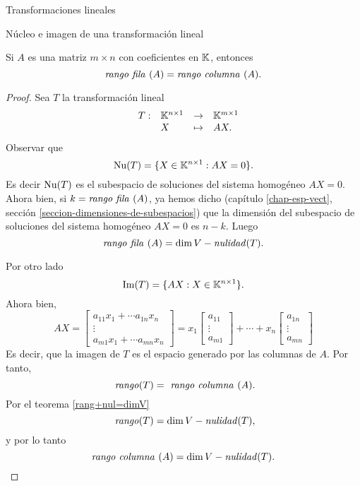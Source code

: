 \begin{chapter}{Transformaciones lineales}
\begin{section}{N\'ucleo e imagen de una transformaci\'on lineal}
        \begin{teorema}
            Si $A$ es una matriz $m \times n$ con coeficientes  en $\mathbb K$, entonces
            $$
            \text{\textit{rango fila }} (A) = \text{\textit{rango  columna }} (A).
            $$
        \end{teorema}
        \begin{proof}
            Sea $T$ la transformación lineal
            \begin{equation*}
                \begin{array}{lllll}
                &T: &\mathbb K^{n \times 1} &\to &\mathbb K^{m \times 1} \\
                &&X &\mapsto &AX.
                \end{array}
            \end{equation*}
            Observar que
            $$
            \operatorname{Nu}(T) = \{X \in \mathbb K^{n \times 1}: AX=0 \}.
            $$
            Es decir $\operatorname{Nu}(T)$  es el subespacio de soluciones del sistema homogéneo $AX=0$. Ahora bien, si $k = \text{\textit{rango fila }} (A)$, ya hemos dicho (capítulo \ref{chap-esp-vect}, sección \ref{seccion-dimensiones-de-subespacios}) que la dimensión del subespacio de soluciones del sistema homogéneo $AX=0$ es $n-k$. Luego
            \begin{equation}\label{rangofila=n-nulT}
                \text{\textit{rango fila }} (A) = \dim V - \text{\textit{nulidad}}(T). 
            \end{equation}
            
            Por otro lado 
            $$
            \operatorname{Im}(T) = \{AX: X \in \mathbb K^{n \times 1} \}.
            $$
            Ahora bien, 
            $$
            AX = 
            \begin{bmatrix} a_{11} x_1 +\cdots a_{1n} x_n \\ \vdots \\ a_{m1} x_1 +\cdots a_{mn} x_n  \end{bmatrix}
            = 
            x_1\begin{bmatrix} a_{11} \\ \vdots \\ a_{m1} \end{bmatrix} + \cdots +
            x_n\begin{bmatrix}  a_{1n}  \\ \vdots \\ a_{mn}  \end{bmatrix}
            $$
            Es decir, que la imagen de $T$ es el espacio generado por las columnas de $A$. Por tanto,
            $$
            \text{\textit{ rango}}(T) =\text{\textit{ rango  columna }}(A).
            $$
            Por  el  teorema \ref{rang+nul=dimV}
            $$
            \text{\textit{ rango}}(T) = \dim V - \text{\textit{nulidad}}(T),
            $$
            y por lo tanto
            \begin{equation}\label{rangocolumna=n-nulT}
            \text{\textit{rango columna }} (A) = \dim V - \text{\textit{nulidad}}(T). 
            \end{equation}
            

\end{proof}
\end{section}
\end{chapter}
